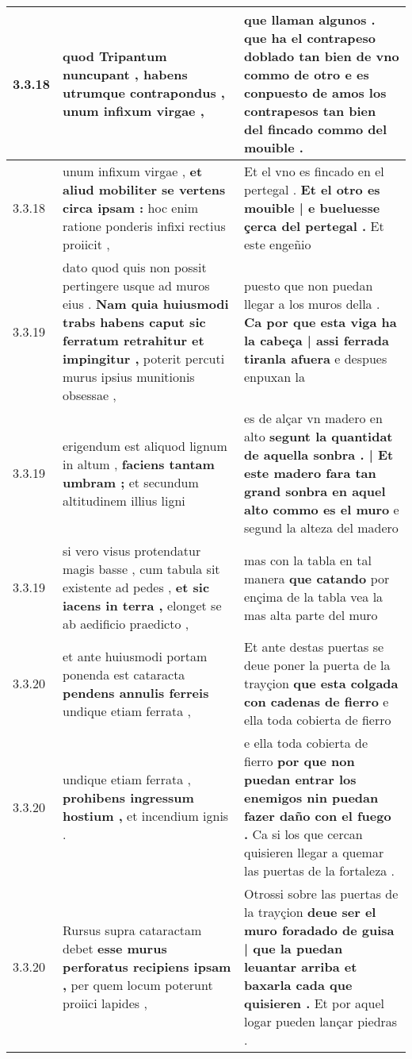 \begin{tabular}{|p{1cm}|p{6.5cm}|p{6.5cm}|}
3.3.18 & quod Tripantum nuncupant , \textbf{ habens utrumque contrapondus , } unum infixum virgae , & que llaman algunos . \textbf{ que ha el contrapeso doblado tan bien de vno commo de otro } e es conpuesto de amos los contrapesos tan bien del fincado commo del mouible . \\\hline
3.3.18 & unum infixum virgae , \textbf{ et aliud mobiliter se vertens circa ipsam : } hoc enim ratione ponderis infixi rectius proiicit , & Et el vno es fincado en el pertegal . \textbf{ Et el otro es mouible | e bueluesse çerca del pertegal . } Et este engeñio \\\hline
3.3.19 & dato quod quis non possit pertingere usque ad muros eius . \textbf{ Nam quia huiusmodi trabs habens caput sic ferratum retrahitur et impingitur , } poterit percuti murus ipsius munitionis obsessae , & puesto que non puedan llegar a los muros della . \textbf{ Ca por que esta viga ha la cabeça | assi ferrada tiranla afuera } e despues enpuxan la \\\hline
3.3.19 & erigendum est aliquod lignum in altum , \textbf{ faciens tantam umbram ; } et secundum altitudinem illius ligni & es de alçar vn madero en alto \textbf{ segunt la quantidat de aquella sonbra . | Et este madero fara tan grand sonbra en aquel alto commo es el muro } e segund la alteza del madero \\\hline
3.3.19 & si vero visus protendatur magis basse , cum tabula sit existente ad pedes , \textbf{ et sic iacens in terra , } elonget se ab aedificio praedicto , & mas con la tabla en tal manera \textbf{ que catando } por ençima de la tabla vea la mas alta parte del muro \\\hline
3.3.20 & et ante huiusmodi portam ponenda est cataracta \textbf{ pendens annulis ferreis } undique etiam ferrata , & Et ante destas puertas se deue poner la puerta de la trayçion \textbf{ que esta colgada con cadenas de fierro } e ella toda cobierta de fierro \\\hline
3.3.20 & undique etiam ferrata , \textbf{ prohibens ingressum hostium , } et incendium ignis . & e ella toda cobierta de fierro \textbf{ por que non puedan entrar los enemigos nin puedan fazer daño con el fuego . } Ca si los que cercan quisieren llegar a quemar las puertas de la fortaleza . \\\hline
3.3.20 & Rursus supra cataractam debet \textbf{ esse murus perforatus recipiens ipsam , } per quem locum poterunt proiici lapides , & Otrossi sobre las puertas de la trayçion \textbf{ deue ser el muro foradado de guisa | que la puedan leuantar arriba et baxarla cada que quisieren . } Et por aquel logar pueden lançar piedras . \\\hline

\end{tabular}
